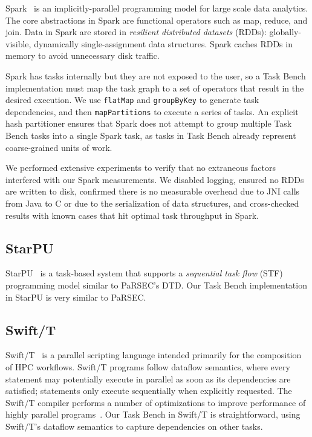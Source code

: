 Spark~\cite{Spark10} is an implicitly-parallel programming model for
large scale data analytics.
The core abstractions in Spark are functional operators such as map,
reduce, and join. Data in Spark are stored in
\emph{resilient
  distributed datasets} (RDDs): globally-visible,
dynamically single-assignment data structures. Spark caches RDDs in memory to avoid unnecessary
disk traffic.

Spark has tasks internally but they are not exposed to the user,
so a Task Bench implementation must map the task graph to a set of operators that result in the
desired execution. We use
\lstinline[language=Scala]{flatMap} and
\lstinline[language=Scala]{groupByKey} to generate task
dependencies, and then \lstinline[language=Scala]{mapPartitions} to execute a
series of tasks. An explicit hash partitioner ensures that
Spark does not attempt to group multiple Task Bench tasks into a
single Spark task, as tasks in Task Bench already represent coarse-grained units of work.

We performed extensive experiments to verify that no
extraneous factors interfered with our Spark measurements. We
disabled logging, ensured no RDDs are written
to disk, confirmed there is no measurable overhead due to JNI
calls from Java to C or due to the serialization of data structures, and cross-checked results with known cases
that hit optimal task throughput in Spark.

\subsection{StarPU}

StarPU~\cite{StarPU11} is a task-based system that supports a \emph{sequential task flow} (STF)
programming model similar to PaRSEC's DTD. Our Task Bench implementation in
StarPU is very similar to PaRSEC.

\subsection{Swift/T}

Swift/T~\cite{Wozniak13} is a parallel scripting language intended
primarily for the composition of HPC workflows. Swift/T
programs follow dataflow semantics, where every statement may
potentially execute in parallel as soon as its dependencies are
satisfied; statements only execute sequentially when explicitly
requested. The Swift/T compiler performs a number of optimizations to
improve performance of highly parallel programs~\cite{Armstrong14}. Our Task Bench in Swift/T is straightforward, using Swift/T's dataflow
semantics to capture dependencies on other tasks.

